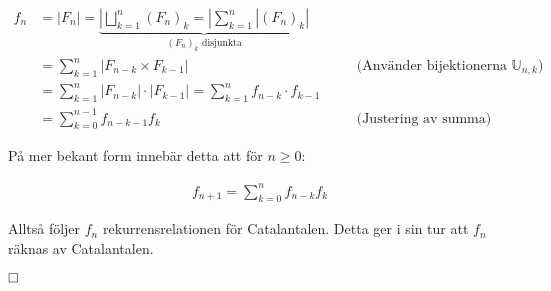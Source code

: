 \documentclass{tufte-handout}
\begin{document}
\begin{ans}
    \vspace{-4mm}

    \begin{align*}
      f_n &= |F_n|= \underbrace{|\bigsqcup_{k = 1}^{n} (F_n)_k = |\sum_{k=1}^{n} |(F_n)_k|}_{\text{$(F_n)_k$ disjunkta}}\\
        &= \sum_{k=1}^{n} |F_{n-k} \times F_{k-1}| &&\quad \text{(Använder bijektionerna $\mathbb{U}_{n, k}$)} \\
        &= \sum_{k=1}^{n} |F_{n-k}| \cdot |F_{k-1}|= \sum_{k=1}^{n} f_{n-k} \cdot f_{k-1} \\
        &= \sum_{k=0}^{n-1} f_{n-k-1} f_{k} &&\quad \text{(Justering av summa)}
    \end{align*}

    \vspace{3mm}
    
    På mer bekant form innebär detta att för $n \geq 0$:

    \vspace{-4mm}

    \begin{align*}
        f_{n+1} = \sum_{k=0}^{n} f_{n-k} f_{k}
    \end{align*}

    Alltså följer $f_n$ rekurrensrelationen för Catalantalen. Detta ger i sin tur att $f_n$ räknas av Catalantalen.

    $\hfill \square$
\end{ans}
\end{document}
